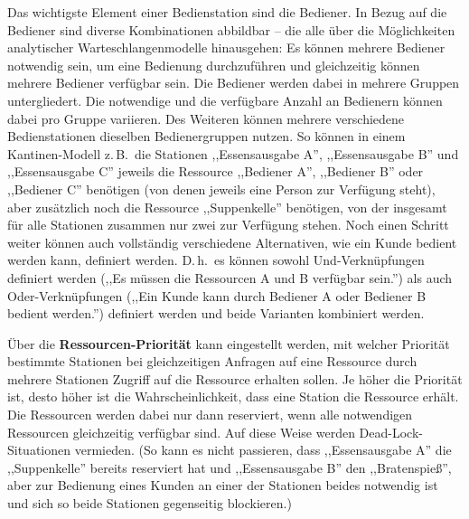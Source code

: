 \documentclass[deutsch]{svmono}
\begin{document}
\begin{itemize}
Das wichtigste Element einer Bedienstation sind die Bediener. In Bezug auf die Bediener sind diverse Kombinationen abbildbar – die alle über die Möglichkeiten analytischer Warteschlangenmodelle hinausgehen: Es können mehrere Bediener notwendig sein, um eine Bedienung durchzuführen und gleichzeitig können mehrere Bediener verfügbar sein. Die Bediener werden dabei in mehrere Gruppen untergliedert. Die notwendige und die verfügbare Anzahl an Bedienern können dabei pro Gruppe variieren. Des Weiteren können mehrere verschiedene Bedienstationen dieselben Bedienergruppen nutzen. So können in einem Kantinen-Modell z.\,B.\ die Stationen ,,Essensausgabe A'', ,,Essensausgabe B'' und ,,Essensausgabe C'' jeweils die Ressource ,,Bediener A'', ,,Bediener B'' oder ,,Bediener C'' benötigen (von denen jeweils eine Person zur Verfügung steht), aber zusätzlich noch die Ressource ,,Suppenkelle'' benötigen, von der insgesamt für alle Stationen zusammen nur zwei zur Verfügung stehen. Noch einen Schritt weiter können auch vollständig verschiedene Alternativen, wie ein Kunde bedient werden kann, definiert werden. D.\,h.\ es können sowohl Und-Verknüpfungen definiert werden (,,Es müssen die Ressourcen A und B verfügbar sein.'') als auch Oder-Verknüpfungen (,,Ein Kunde kann durch Bediener A oder Bediener B bedient werden.'') definiert werden und beide Varianten kombiniert werden.

Über die \textbf{Ressourcen-Priorität} kann eingestellt werden, mit welcher Priorität bestimmte Stationen bei gleichzeitigen Anfragen auf eine Ressource durch mehrere Stationen Zugriff auf die Ressource erhalten sollen. Je höher die Priorität ist, desto höher ist die Wahrscheinlichkeit, dass eine Station die Ressource erhält. Die Ressourcen werden dabei nur dann reserviert, wenn alle notwendigen Ressourcen gleichzeitig verfügbar sind. Auf diese Weise werden Dead-Lock-Situationen vermieden. (So kann es nicht passieren, dass ,,Essensausgabe A'' die ,,Suppenkelle'' bereits reserviert hat und ,,Essensausgabe B'' den ,,Bratenspieß'', aber zur Bedienung eines Kunden an einer der Stationen beides notwendig ist und sich so beide Stationen gegenseitig blockieren.)


\end{itemize}
\end{document}
